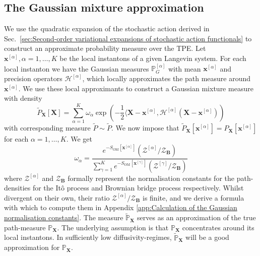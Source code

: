 \subsection{The Gaussian mixture approximation} \label{sec:The Gaussian mixture approximation}

We use the quadratic expansion of the stochastic action derived in Sec.~\ref{sec:Second-order variational expansions of stochastic action functionals} to construct an approximate probability measure over the TPE. Let $\mathbf{x}^{[\alpha]},\alpha=1,\dots,K$ be the local instantons of a given Langevin system. For each local instanton we have the Gaussian measures $\mathbb{P}_G^{[\alpha]}$ with mean $\mathbf{x}^{[\alpha]}$ and precision operators $\mathcal{H}^{[\alpha]}$, which locally approximates the path measure around $\mathbf{x}^{[\alpha]}$. We use these local approximants to construct a Gaussian mixture measure with density
\begin{equation} \label{eq:gaussian mixture approx of TPE}
	\tilde{P}_\mathbf{X}[\mathbf{X}] = \sum_{\alpha=1}^K \omega_\alpha \exp \left( - \frac{1}{2} \langle \mathbf{X} - \mathbf{x}^{[\alpha]}, \mathcal{H}^{[\alpha]} (\mathbf{X} - \mathbf{x}^{[\alpha]}) \right)
\end{equation}
with corresponding measure $\tilde{P} \sim \tilde{P}$. We now impose that $\tilde{P}_\mathbf{X}[\mathbf{x}^{[\alpha]}] = P_\mathbf{X}[\mathbf{x}^{[\alpha]}]$ for each $\alpha = 1,\dots,K$. We get
\begin{equation} \label{eq:gaussian mixture approx weights}
	\omega_\alpha = \frac{e^{-S_{\text{OM}}[\mathbf{x}^{[\alpha]}]} (\mathcal{Z}^{[\alpha]} / \mathcal{Z}_\mathbf{B}) }{ \sum_{\gamma=1}^{K}e^{-S_{\text{OM}}[\mathbf{x}^{[\gamma]}]}(\mathcal{Z}^{[\gamma]} / \mathcal{Z}_\mathbf{B}) }
\end{equation}
where $\mathcal{Z}^{[\alpha]}$ and $\mathcal{Z}_\mathbf{B}$ formally represent the normalisation constants for the path-densities for the It\^{o} process and Brownian bridge process respectively. Whilst divergent on their own, their ratio $\mathcal{Z}^{[\alpha]} / \mathcal{Z}_\mathbf{B}$ is finite, and we derive a formula with which to compute them in Appendix \ref{app:Calculation of the Gaussian normalisation constants}. The measure $\tilde{\mathbb{P}}_\mathbf{X}$ serves as an approximation of the true path-measure $\mathbb{P}_\mathbf{X}$. The underlying assumption is that $\mathbb{P}_\mathbf{X}$ concentrates around its local instantons. In sufficiently low diffusivity-regimes, $\tilde{\mathbb{P}}_\mathbf{X}$ will be a good approximation for $\mathbb{P}_\mathbf{X}$.

